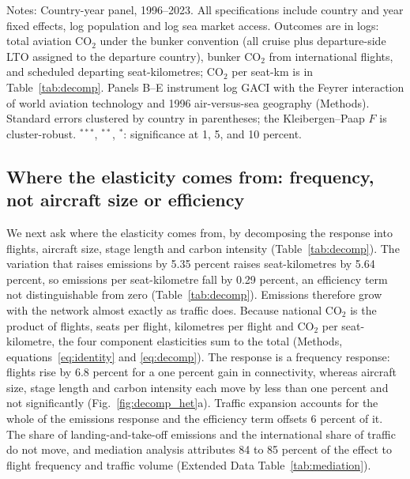 \documentclass[12pt]{extarticle}
\begin{document}
\begin{table}[H]
{\begin{threeparttable}
\begin{tabular}{lccc}
\bottomrule
\end{tabular}
\begin{tablenotes}[flushleft]
\footnotesize
\item Notes: Country-year panel, 1996--2023. All specifications include country and year fixed effects, log population and log sea market access. Outcomes are in logs: total aviation CO$_2$ under the bunker convention (all cruise plus departure-side LTO assigned to the departure country), bunker CO$_2$ from international flights, and scheduled departing seat-kilometres; CO$_2$ per seat-km is in Table~\ref{tab:decomp}. Panels B--E instrument log GACI with the Feyrer interaction of world aviation technology and 1996 air-versus-sea geography (Methods). Standard errors clustered by country in parentheses; the Kleibergen--Paap $F$ is cluster-robust. $^{***}$, $^{**}$, $^{*}$: significance at 1, 5, and 10 percent.
\end{tablenotes}
\end{threeparttable}}
\end{table}

\subsection*{Where the elasticity comes from: frequency, not aircraft size
or efficiency}
We next ask where the elasticity comes from, by decomposing the
response into flights, aircraft size, stage length and carbon intensity
(Table~\ref{tab:decomp}). The variation that raises emissions by 5.35 percent raises seat-kilometres by 5.64 percent, so emissions per seat-kilometre fall by
0.29 percent, an efficiency term not distinguishable from zero
(Table~\ref{tab:decomp}). Emissions therefore grow with the network
almost exactly as traffic does. Because national CO$_2$ is the product of
flights, seats per flight, kilometres per flight and CO$_2$ per
seat-kilometre, the four component elasticities sum to the total
(Methods, equations~\ref{eq:identity} and \ref{eq:decomp}). The response is a frequency response: flights rise by 6.8
percent for a one percent gain in connectivity, whereas aircraft size,
stage length and carbon intensity each move by less than one percent and
not significantly (Fig.~\ref{fig:decomp_het}a). Traffic
expansion accounts for the whole of the emissions response and the
efficiency term offsets 6 percent of it. The share of
landing-and-take-off emissions and the international share of traffic do
not move, and mediation analysis attributes 84 to 85 percent of the effect
to flight frequency and traffic volume (Extended Data
Table~\ref{tab:mediation}).
\end{document}

